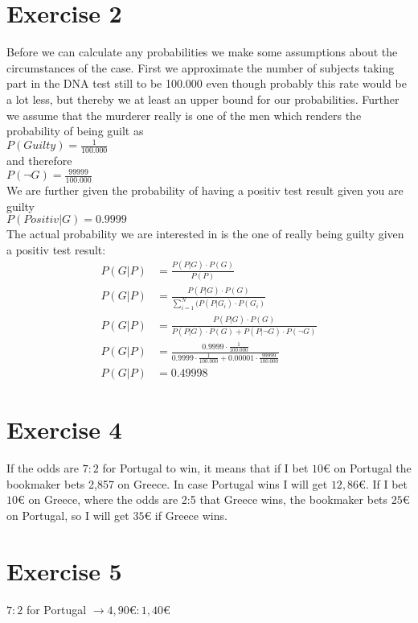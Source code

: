 \def \TutorialSheetNumber{3}


\section*{Exercise 2}
Before we can calculate any probabilities we make some assumptions about the circumstances of the case. First we approximate the number of subjects taking part in the DNA test still to be 100.000 even though probably this rate would be a lot less, but thereby we at least an upper bound for our probabilities. Further we assume that the murderer really is one of the men which renders the probability of being guilt as \\ 
$P(Guilty) = \frac{1}{100.000}$\\
and therefore\\
$P(\neg G) = \frac{99999}{100.000}$\\
We are further given the probability of having a positiv test result given you are guilty \\
$P(Positiv|G) = 0.9999 $ \\
The actual probability we are interested in is the one of really being guilty given a positiv test result: \\
\begin{align*}
  P(G | P) & = \frac{P(P|G) \cdot P(G)}{P(P)} \\
  P(G | P) & = \frac{P(P|G) \cdot P(G)}{\sum\limits_{i=1}^{N}(P(P|G_i)\cdot P(G_i)}\\
  P(G | P) & = \frac{P(P|G) \cdot P(G)}{P(P|G)\cdot P(G) + P(P|\neg G)\cdot P(\neg G)} \\
  P(G | P) & = \frac{0.9999 \cdot \frac{1}{100.000}}{0.9999 \cdot \frac{1}{100.000} + 0.00001 \cdot \frac{99999}{100.000}}\\
  P(G | P) & = 0.49998
\end{align*}
 
\section*{Exercise 4}
If the odds are $7 : 2$ for Portugal to win, it means that if I bet $10€$ on Portugal the bookmaker bets 2,857 on Greece. In case Portugal wins I will get $12,86€$.
If I bet $10€$ on Greece, where the odds are 2:5 that Greece wins, the bookmaker bets $25€$ on Portugal, so I will get $35€$ if Greece wins.

\section*{Exercise 5}
$7 : 2$ for Portugal $\rightarrow 4,90€ : 1,40€$




